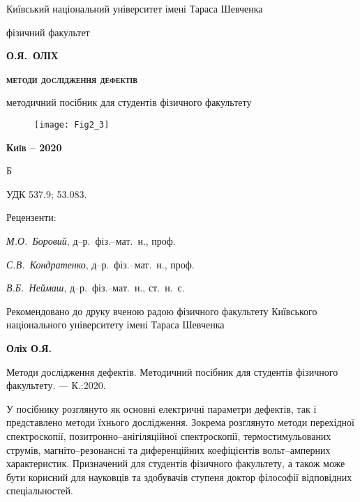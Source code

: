 \begin{titlepage}
\begin{center}

{\small Київський національний університет  імені Тараса Шевченка}

{\small фізичний факультет}


\vspace*{2cm}
{\scshape\bfseries\Large О.Я.~ОЛІХ}

\vspace*{1cm}
{\scshape\bfseries\huge методи дослідження дефектів}

\vspace*{0.5cm}
методичний посібник для студентів фізичного факультету

\end{center}
%
\vspace*{2cm}
\begin{figure}[h]\center
\texttt{[image: Fig2\_3]}
\end{figure}
%
%
\begin{center}

{\scshape\bfseries Київ -- 2020}
\end{center}
\end{titlepage}
Б

УДК 537.9; 53.083.

\begin{center}

 \vspace{0.04\textheight}
 Рецензенти:
\end{center}

\emph{М.О.~Боровий}, д--р.~фіз.--мат.~н., проф.

\emph{С.В.~Кондратенко}, д--р.~фіз.--мат.~н., проф.

\emph{В.Б.~Неймаш}, д--р.~фіз.--мат.~н., ст.~н.~с.


\vspace{1cm}
Рекомендовано до друку вченою радою фізичного факультету
Київського національного університету імені Тараса Шевченка



\vspace{1cm}
\textbf{Оліх О.Я.}

Методи дослідження дефектів. Методичний посібник для студентів фізичного факультету. --- К.:2020.

\vspace{1cm}
У посібнику розглянуто як основні електричні параметри дефектів,
так і представлено методи їхнього дослідження.
Зокрема розглянуто методи перехідної спектроскопії,
позитронно--анігіляційної спектроскопії,
термостимульованих струмів,
магніто--резонансні
та диференційних коефіцієнтів вольт--амперних характеристик.
Призначений для студентів фізичного факультету, а також
може бути корисний для науковців  та  здобувачів  ступеня  доктор  філософії
відповідних спеціальностей.

